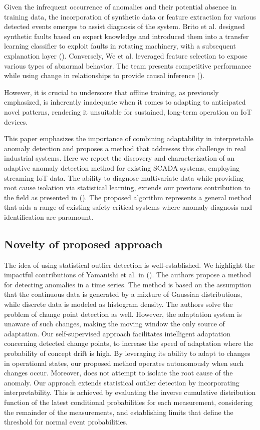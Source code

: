 Given the infrequent occurrence of anomalies and their potential absence in training data, the incorporation of synthetic data or feature extraction for various detected events emerges to assist diagnosis of the system. Brito et al. designed synthetic faults based on expert knowledge and introduced them into a transfer learning classifier to exploit faults in rotating machinery, with a subsequent explanation layer (\cite{BRITO2023120860}). Conversely, We et al. leveraged feature selection to expose various types of abnormal behavior. The team presents competitive performance while using change in relationships to provide causal inference (\cite{WU2024121539}).

However, it is crucial to underscore that offline training, as previously emphasized, is inherently inadequate when it comes to adapting to anticipated novel patterns, rendering it unsuitable for sustained, long-term operation on IoT devices.

This paper emphasizes the importance of combining adaptability in interpretable anomaly detection and proposes a method that addresses this challenge in real industrial systems. Here we report the discovery and characterization of an adaptive anomaly detection method for existing SCADA systems, employing streaming IoT data. The ability to diagnose multivariate data while providing root cause isolation via statistical learning, extends our previous contribution to the field as presented in (\cite{Wadinger2023}). The proposed algorithm represents a general method that aids a range of existing safety-critical systems where anomaly diagnosis and identification are paramount.

\subsection{Novelty of proposed approach}
The idea of using statistical outlier detection is well-established. We highlight the impactful contributions of Yamanishi et al. in (\cite{Yamanishi2002, Yamanishi2004}). The authors propose a method for detecting anomalies in a time series. The method is based on the assumption that the continuous data is generated by a mixture of Gaussian distributions, while discrete data is modeled as histogram density. The authors solve the problem of change point detection as well. However, the adaptation system is unaware of such changes, making the moving window the only source of adaptation. Our self-supervised approach facilitates intelligent adaptation concerning detected change points, to increase the speed of adaptation where the probability of concept drift is high. By leveraging its ability to adapt to changes in operational states, our proposed method operates autonomously when such changes occur. Moreover, \cite{Yamanishi2004} does not attempt to isolate the root cause of the anomaly. Our approach extends statistical outlier detection by incorporating interpretability. This is achieved by evaluating the inverse cumulative distribution function of the latest conditional probabilities for each measurement, considering the remainder of the measurements, and establishing limits that define the threshold for normal event probabilities.

